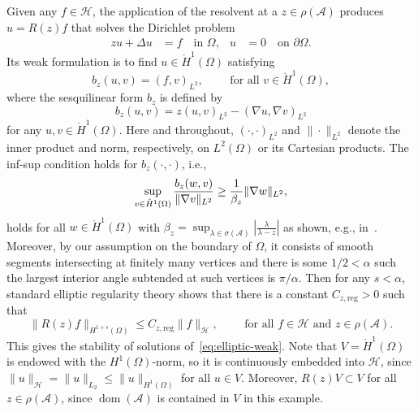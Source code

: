\documentclass[12pt, oneside, reqno]{amsart}
\theoremstyle{remark}
\newcommand{\tForAll}{\text{ for all }}
\DeclareMathOperator{\dom}{dom}
\DeclarePairedDelimiter{\norm}{\lVert}{\rVert}
\newcommand{\Ac}{\mathcal{A}}
\newcommand{\Hc}{\mathcal{H}}
\newcommand{\om}{\Omega}
\newcommand{\Ho}{\mathring{H}}
\newcommand{\Cregz}{C_{z,\text{reg}}}
\begin{document}
Given any $f \in \Hc$, the application of the resolvent at a
$z \in \rho(\Ac)$ produces $u = R(z) f$ that solves the Dirichlet problem 
\begin{align}\label{eq:elliptic-resolvent}
  z u + \Delta u &= f \quad \text{in } \Omega, 
  & u & = 0 \quad \text{on } \partial \Omega.
\end{align}
Its weak formulation is to find  $u \in \Ho^1(\om)$ satisfying
\begin{equation}
  b_z(u, v) = (f, v)_{L^2}, \qquad \tForAll v \in \mathring{H}^1(\Omega),
  \label{eq:elliptic-weak}
\end{equation}
where the sesquilinear form \(b_z\) is defined by
\begin{equation}
  b_z(u, v) = z (u, v)_{L^2}
  -(\nabla u, \nabla v)_{L^2}
  \label{eq:elliptic-bilinear}
\end{equation}
for any $ u, v \in \mathring{H}^1(\Omega).$ Here and throughout,
$(\cdot, \cdot)_{L^2}$ and $\| \cdot \|_{L^2}$ denote the inner
product and norm, respectively, on $L^2(\om)$ or its Cartesian
products.  The inf-sup condition holds for $b_z(\cdot, \cdot)$, i.e., 
\begin{equation}
  \label{eq:Laplace-inf-sup'}
  \sup_{v \in \mathring{H}^1(\Omega)}
  \frac{b_z(w, v)}{\| \nabla v \|_{L^2}}
  \geq
  \frac{1}{\beta_z}
  \norm{\nabla w}_{L^2%
  }, 
\end{equation}
holds for all $w \in \mathring{H}^1(\Omega) $ with
$ \beta_z = \sup_{\lambda \in \sigma(\Ac)} \left\lvert
  \frac{\lambda}{\lambda - z} \right\rvert$
as shown, e.g.,  in~\cite[Lemma 3.1]{GopGruOvaPar2019-1}.
 Moreover, by our
assumption on the boundary of $\om$, it consists of smooth segments
intersecting at finitely many vertices and there is some
$1/2 < \alpha$ such the largest interior angle subtended at such
vertices is $\pi/\alpha$.  Then for any $s < \alpha$, standard
elliptic regularity theory \cite{Grisv85} shows that there is a
constant $\Cregz >0$ such that
\begin{equation}
  \label{eq:regularity}
  \| R(z) f \|_{H^{1+s}(\om)} \le \Cregz \| f \|_{\Hc},
  \qquad \text{ for all }  f \in \Hc \text { and } z \in \rho(\Ac).
\end{equation}
This gives the stability of solutions of~\eqref{eq:elliptic-weak}.
Note that \(V=\Ho^1(\om)\) is endowed with the $H^1(\om)$-norm, so it is continuously embedded into \(\Hc\), since \(\|u\|_{\Hc} = \|u\|_{L_2} \leq \|u\|_{H^1(\Omega)}\)
for all \(u \in V\).
Moreover, \(R(z)V \subset V\) for all \(z \in \rho(\Ac)\), since   \(\dom (\Ac)\) is contained in \(V\) in this example.
\end{document}
